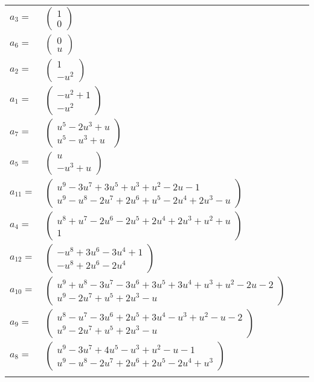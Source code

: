 \documentclass[1p]{elsarticle_modified}
\theoremstyle{definition}
\begin{document}
\begin{tabular}{m{7pt} m{180pt} m{7pt} m{180pt} }
\flushright $a_{3}=$&$\begin{pmatrix}1\\0\end{pmatrix}$ \\
\flushright $a_{6}=$&$\begin{pmatrix}0\\u\end{pmatrix}$ \\
\flushright $a_{2}=$&$\begin{pmatrix}1\\- u^2\end{pmatrix}$ \\
\flushright $a_{1}=$&$\begin{pmatrix}- u^2+1\\- u^2\end{pmatrix}$ \\
\flushright $a_{7}=$&$\begin{pmatrix}u^5-2 u^3+u\\u^5- u^3+u\end{pmatrix}$ \\
\flushright $a_{5}=$&$\begin{pmatrix}u\\- u^3+u\end{pmatrix}$ \\
\flushright $a_{11}=$&$\begin{pmatrix}u^9-3 u^7+3 u^5+u^3+u^2-2 u-1\\u^9- u^8-2 u^7+2 u^6+u^5-2 u^4+2 u^3- u\end{pmatrix}$ \\
\flushright $a_{4}=$&$\begin{pmatrix}u^8+u^7-2 u^6-2 u^5+2 u^4+2 u^3+u^2+u\\1\end{pmatrix}$ \\
\flushright $a_{12}=$&$\begin{pmatrix}- u^8+3 u^6-3 u^4+1\\- u^8+2 u^6-2 u^4\end{pmatrix}$ \\
\flushright $a_{10}=$&$\begin{pmatrix}u^9+u^8-3 u^7-3 u^6+3 u^5+3 u^4+u^3+u^2-2 u-2\\u^9-2 u^7+u^5+2 u^3- u\end{pmatrix}$ \\
\flushright $a_{9}=$&$\begin{pmatrix}u^8- u^7-3 u^6+2 u^5+3 u^4- u^3+u^2- u-2\\u^9-2 u^7+u^5+2 u^3- u\end{pmatrix}$ \\
\flushright $a_{8}=$&$\begin{pmatrix}u^9-3 u^7+4 u^5- u^3+u^2- u-1\\u^9- u^8-2 u^7+2 u^6+2 u^5-2 u^4+u^3\end{pmatrix}$\\&\end{tabular}
\end{document}
